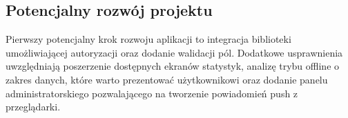 \documentclass[11pt,titlepage]{article}
\begin{document}
\subsection{Potencjalny rozwój projektu}
Pierwszy potencjalny krok rozwoju aplikacji to integracja biblioteki umożliwiającej autoryzacji oraz dodanie walidacji pól. Dodatkowe usprawnienia uwzględniają poszerzenie dostępnych ekranów statystyk, analizę trybu offline o zakres danych, które warto prezentować użytkownikowi oraz dodanie panelu administratorskiego pozwalającego na tworzenie powiadomień push z przeglądarki.
\end{document}

